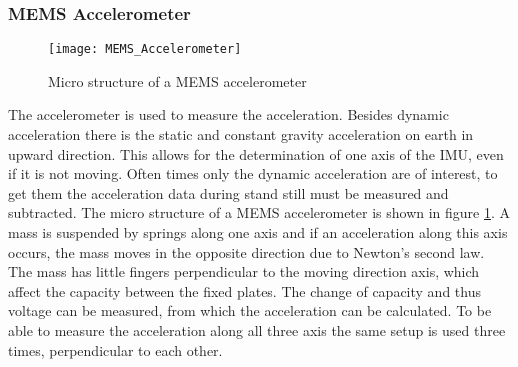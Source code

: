 \subsubsection{MEMS Accelerometer}
\begin{figure}[htb]
	\centering
	\texttt{[image: MEMS\_Accelerometer]}
	\caption{Micro structure of a MEMS accelerometer }
	\label{fig:MEMS_Accelerometer}
\end{figure}
The accelerometer is used to measure the acceleration.
Besides dynamic acceleration there is the static and constant gravity acceleration on earth in upward direction. 
This allows for the determination of one axis of the IMU, even if it is not moving.
Often times only the dynamic acceleration are of interest, to get them the acceleration data during stand still must be measured and subtracted.
The micro structure of a MEMS accelerometer is shown in figure \ref{fig:MEMS_Accelerometer}.
A mass is suspended by springs along one axis and if an acceleration along this axis occurs, the mass moves in the opposite direction due to Newton's second law.
The mass has little fingers perpendicular to the moving direction axis, which affect the capacity between the fixed plates.
The change of capacity and thus voltage can be measured, from which the acceleration can be calculated.
To be able to measure the acceleration along all three axis the same setup is used three times, perpendicular to each other.

